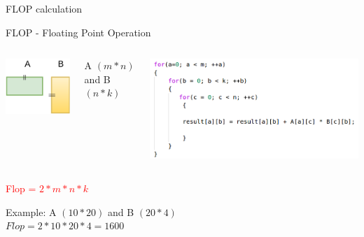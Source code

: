 \documentclass[10pts]{beamer}
\begin{document}
	   	  
	   	  \begin{frame}{FLOP calculation}
	   	  	\begin{center}
	   	  	 FLOP - Floating Point Operation \vspace{20pt}	
	   	  
	   	 
	   	  \begin{columns}
	   	        \includegraphics[scale =0.3]{matrix_commutation.png}
	   	        
	   	        A $(m*n)$ and B $(n*k)$
	   	        
	   	       
	   	 
	   	          \includegraphics[scale =0.24]{tripple_loop.png}
	   	          
	   	         
	   	  \end{columns}
	   	  \vspace{15pt}
	   	   \textcolor{red}{Flop = $2*m*n*k$}
	   	   
	   	   
	   	   Example:  A $(10*20)$ and B $(20*4)$\\
	   	   $Flop = 2*10*20*4 = 1600$ 
	   	  	
	   	  	\end{center}
	   	  \end{frame}
	   	
\end{document}

